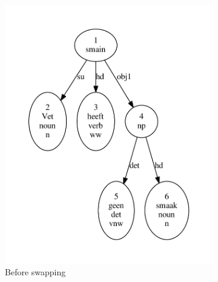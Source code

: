 \begin{figure}[t]
    \begin{subfigure}{0.49\textwidth}
        \centering
        \includegraphics[scale=0.48]{Figures/invdet1.pdf}
        \caption{Before swapping}
    \end{subfigure}
    \begin{subfigure}{0.49\textwidth}
        \centering

\end{subfigure}
\end{figure}

